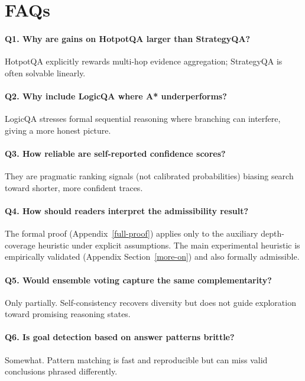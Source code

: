 \documentclass[11pt]{article}
\begin{document}

\section{FAQs}
\label{app:faqs}

\paragraph{Q1. Why are gains on HotpotQA larger than StrategyQA?}
HotpotQA explicitly rewards multi-hop evidence aggregation; StrategyQA is often solvable linearly.

\paragraph{Q2. Why include LogicQA where A* underperforms?}
LogicQA stresses formal sequential reasoning where branching can interfere, giving a more honest picture.

\paragraph{Q3. How reliable are self-reported confidence scores?}
They are pragmatic ranking signals (not calibrated probabilities) biasing search toward shorter, more confident traces.

\paragraph{Q4. How should readers interpret the admissibility result?}
The formal proof (Appendix~\ref{full-proof}) applies only to the auxiliary depth-coverage heuristic under explicit assumptions. The main experimental heuristic is empirically validated (Appendix Section~\ref{more-on}) and also formally admissible.

\paragraph{Q5. Would ensemble voting capture the same complementarity?}
Only partially. Self-consistency recovers diversity but does not guide exploration toward promising reasoning states.

\paragraph{Q6. Is goal detection based on answer patterns brittle?}
Somewhat. Pattern matching is fast and reproducible but can miss valid conclusions phrased differently.
\end{document}

